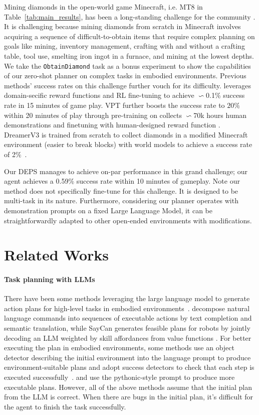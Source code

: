 \documentclass{article}
\begin{document}
Mining diamonds in the open-world game Minecraft, i.e. MT8 in Table~\ref{tab:main_results}, has been a long-standing challenge for the community \cite{minerl}. It is challenging because mining diamonds from scratch in Minecraft involves acquiring a sequence of difficult-to-obtain items that require complex planning on goals like mining, inventory management, crafting with and without a crafting table, tool use, smelting iron ingot in a furnace, and mining at the lowest depths. 
We take the \texttt{ObtainDiamond} task as a bonus experiment to show the capabilities of our zero-shot planner on complex tasks in embodied environments. 
Previous methods' success rates on this challenge further vouch for its difficulty. \cite{skrynnik2021forgetful,patil2020align} leverages domain-secific reward functions and RL fine-tuning to achieve $\backsim$0.1\% success rate in 15 minutes of game play.
VPT further boosts the success rate to $20\%$ within 20 minutes of play through pre-training on collects $\backsim$70k hours human demonstrations and finetuning with human-designed reward function \cite{vpt}.
DreamerV3 is trained from scratch to collect diamonds in a modified Minecraft environment (easier to break blocks) with world models to achieve a success rate of 2\%~\cite{dreamerv3}.

Our DEPS manages to achieve on-par performance in this grand challenge; our agent achieves a 0.59\% success rate within 10 minutes of gameplay. Note our method does not specifically fine-tune for this challenge. It is designed to be multi-task in its nature. Furthermore, considering our planner operates with demonstration prompts on a fixed Large Language Model, it can be straightforwardly adapted to other open-ended environments with modifications.

\section{Related Works}\label{sec:related_works}

\paragraph{Task planning with LLMs}
There have been some methods leveraging the large language model to generate action plans for high-level tasks in embodied environments~\cite{socraticmodels,reporter,jxma4}.
\cite{huang2022language} decompose natural language commands into sequences of executable actions by text completion and semantic translation, while SayCan generates feasible plans for robots by jointly decoding an LLM weighted by skill affordances from value functions \cite{saycan}.
For better executing the plan in embodied environments, some methods use an object detector describing the initial environment into the language prompt to produce environment-suitable plans and adopt success detectors to check that each step is executed successfully~\cite{innermonologue,codeaspolicies}.
\cite{progprompt} and \cite{codeaspolicies} use the pythonic-style prompt to produce more executable plans.
However, all of the above methods assume that the initial plan from the LLM is correct. When there are bugs in the initial plan, it's difficult for the agent to finish the task successfully.
\end{document}
